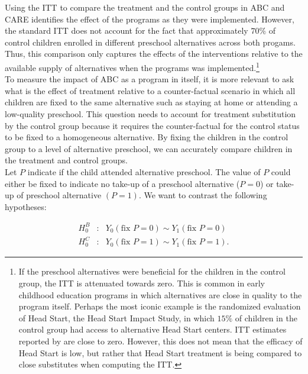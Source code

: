 \noindent Using the ITT to compare the treatment and the control groups in ABC and CARE identifies the effect of the programs as they were implemented. However, the standard ITT does not account for the fact that approximately $70 \%$ of control children enrolled in different preschool alternatives across both progams. Thus, this comparison only captures the effects of the interventions relative to the available supply of alternatives when the programs was implemented.\footnote{If the preschool alternatives were beneficial for the children in the control group, the ITT is attenuated towards zero. This is common in early childhood education programs in which alternatives are close in quality to the program itself. Perhaps the most iconic example is the randomized evaluation of Head Start, the Head Start Impact Study, in which $15\%$ of children in the control group had access to alternative Head Start centers. ITT estimates reported by \cite{Puma_Bell_etal_2010_HeadStartImpact} are close to zero. However, this does not mean that the efficacy of Head Start is low, but rather that Head Start treatment is being compared to close substitutes when computing the ITT.} \\

\noindent To measure the impact of ABC as a program in itself, it is more relevant to ask what is the effect of treatment relative to a counter-factual scenario in which all children are fixed to the same alternative such as staying at home or attending a low-quality preschool. This question needs to account for treatment substitution by the control group because it requires the counter-factual for the control status to be fixed to a homogeneous alternative. By fixing the children in the control group to a level of alternative preschool, we can accurately compare children in the treatment and control groups. \\

\noindent Let $P$ indicate if the child attended alternative preschool. The value of $P$ could either be fixed to indicate no take-up of a preschool alternative ($P = 0$) or take-up of preschool alternative $(P = 1)$. We want to contrast the following hypotheses: 

\begin{eqnarray}
H_{0}^B &:& Y_{0} \left( \text{fix } P = 0 \right) \sim Y_{1} \left( \text{fix } P = 0 \right) \label{eq:hoB} \\
H_{0}^C &:& Y_{0} \left( \text{fix } P = 1 \right) \sim Y_{1} \left( \text{fix } P = 1\right) \label{eq:hoC}. 
\end{eqnarray}

